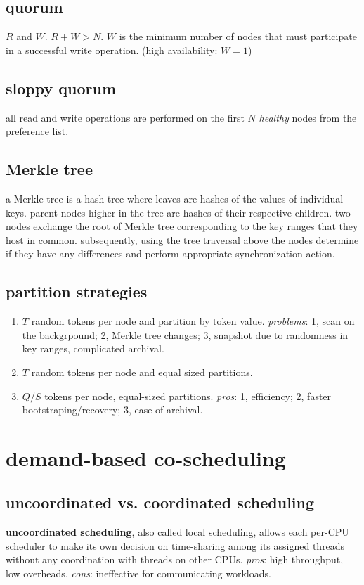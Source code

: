 \documentclass[9pt,conference]{IEEEtran}
\begin{document}
\subsection{quorum}
\label{sec-10-4}
$R$ and $W$. $R + W > N$.
$W$ is the minimum number of nodes that must participate in a successful write operation.
(high availability: $W = 1$)

\subsection{sloppy quorum}
\label{sec-10-5}
all read and write operations are performed on the first $N$ \emph{healthy} nodes from the preference list.

\subsection{Merkle tree}
\label{sec-10-6}
a Merkle tree is a hash tree where leaves are hashes of the values of individual keys.
parent nodes higher in the tree are hashes of their respective children.
two nodes exchange the root of Merkle tree corresponding to the key ranges that
they host in common. subsequently,
using the tree traversal above the nodes determine if they have any differences and perform appropriate synchronization action.

\subsection{partition strategies}
\label{sec-10-7}
\begin{enumerate}
\item $T$ random tokens per node and partition by token value. \emph{problems}: 1, scan on the backgrpound; 2, Merkle tree changes; 3, snapshot due to randomness in key ranges, complicated archival.
\item $T$ random tokens per node and equal sized partitions.
\item $Q/S$ tokens per node, equal-sized partitions. \emph{pros}: 1, efficiency; 2, faster bootstraping/recovery; 3, ease of archival.
\end{enumerate}

\section{demand-based co-scheduling}
\label{sec-11}
\subsection{uncoordinated vs. coordinated scheduling}
\label{sec-11-1}
\textbf{uncoordinated scheduling}, also called local scheduling, allows
each per-CPU scheduler to make its own decision on time-sharing
among its assigned threads without any coordination with threads
on other CPUs.
\emph{pros}: high throughput, low overheads.
\emph{cons}: ineffective for communicating workloads.
\end{document}
